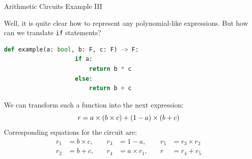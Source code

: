 \documentclass{zkdl-presentation-template}
\begin{document}
    \begin{frame}[fragile]{Arithmetic Circuits Example III}
        \begin{example}
            Well, it is quite clear how to represent any polynomial-like expressions. But how can we
            translate \texttt{if} statements?
            \begin{lstlisting}[language=Python, numbers=none, autogobble=true, xleftmargin=8pt]
                def example(a: bool, b: F, c: F) -> F:
                    if a:
                        return b * c 
                    else:
                        return b + c
            \end{lstlisting}
            \pause
            We can transform such a function into the next expression:
            \vspace{-8pt}
            \begin{equation*}
                r = a \times (b \times c) + (1 - a) \times (b + c)    
                \vspace{-8pt}
            \end{equation*}
            \pause
            Corresponding equations for the circuit are:
            \vspace{-8pt}
            \begin{equation*}
                \begin{aligned}
                    r_1 &= b \times c, \quad &r_3 &= 1 - a, \quad &r_5 &= r_3 \times r_2 \\
                    r_2 &= b + c, \quad &r_4 &= a \times r_1, \quad &r &= r_4 + r_5
                \end{aligned}
            \end{equation*}
        \end{example}
    \end{frame}
\end{document}
